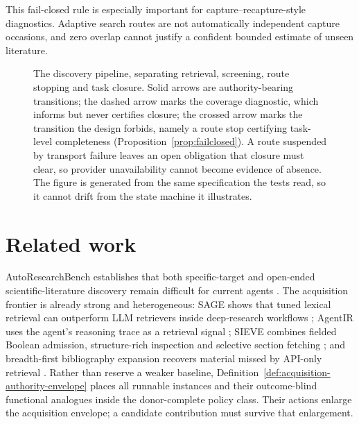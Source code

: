\documentclass[11pt]{article}
\theoremstyle{definition}
\begin{document}
This fail-closed rule is especially important for capture--recapture-style diagnostics. Adaptive search routes are not automatically independent capture occasions, and zero overlap cannot justify a confident bounded estimate of unseen literature.





\begin{figure}[t]
\centering

\caption{The discovery pipeline, separating retrieval,
screening, route stopping and task closure. Solid arrows are authority-bearing
transitions; the dashed arrow marks the coverage diagnostic, which informs but
never certifies closure; the crossed arrow marks the transition the design
forbids, namely a route stop certifying task-level completeness
(Proposition~\ref{prop:failclosed}). A route suspended by transport failure
leaves an open obligation that closure must clear, so provider unavailability
cannot become evidence of absence. The figure is generated from the same
specification the tests read, so it cannot drift from the state machine it
illustrates.}
\label{fig:p2-1}
\end{figure}







\section{Related work}
AutoResearchBench establishes that both specific-target and open-ended
scientific-literature discovery remain difficult for current agents
\cite{autoresearchbench2026}.  The acquisition frontier is already strong and
heterogeneous: SAGE shows that tuned lexical retrieval can outperform LLM
retrievers inside deep-research workflows \cite{sage2026}; AgentIR uses the
agent's reasoning trace as a retrieval signal \cite{agentir2026}; SIEVE combines
fielded Boolean admission, structure-rich inspection and selective section
fetching \cite{sieve2026}; and breadth-first bibliography expansion recovers
material missed by API-only retrieval \cite{rethinkinglitsearch2026}.  Rather
than reserve a weaker baseline,
Definition~\ref{def:acquisition-authority-envelope} places all runnable instances and
their outcome-blind functional analogues inside the donor-complete policy class.
Their actions enlarge the acquisition envelope; a candidate contribution must
survive that enlargement.
\end{document}
